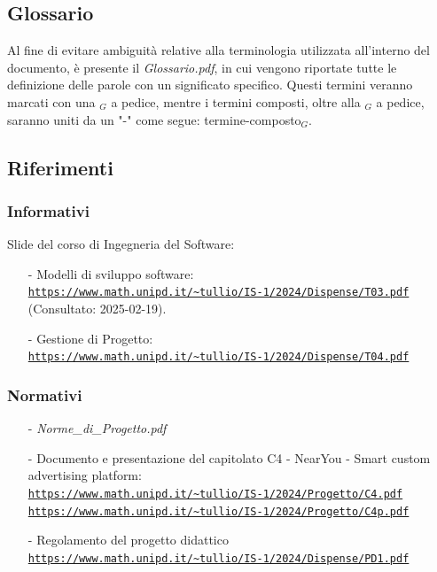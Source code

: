 \documentclass[10pt]{article}
\begin{document}
\subsection{Glossario}
Al fine di evitare ambiguità relative alla terminologia utilizzata all'interno del documento, è presente il \textit{Glossario.pdf}, in cui vengono riportate tutte le definizione delle parole con un significato specifico. Questi termini veranno marcati con una $_G$ a pedice, mentre i termini composti, oltre alla $_G$ a pedice, saranno uniti da un "-" come segue: termine-composto$_G$. 

\subsection{Riferimenti}
\subsubsection{Informativi}
Slide del corso di Ingegneria del Software:
\begin{itemize}
\item [-] Modelli di sviluppo software:\\ \textcolor{blue}{\texttt{\url{https://www.math.unipd.it/~tullio/IS-1/2024/Dispense/T03.pdf}}}\\
(Consultato: 2025-02-19).
    \item [-] Gestione di Progetto:\\ \textcolor{blue}{\texttt{\url{https://www.math.unipd.it/~tullio/IS-1/2024/Dispense/T04.pdf}}}
\end{itemize}

\subsubsection{Normativi}
\begin{itemize}
	\item [-] \textit{Norme\_di\_Progetto.pdf}
    \item [-] Documento e presentazione del capitolato C4 - NearYou - Smart custom advertising platform:\\
    \textcolor{blue}{\texttt{\url{https://www.math.unipd.it/~tullio/IS-1/2024/Progetto/C4.pdf}}}\\
    \textcolor{blue}{\texttt{\url{https://www.math.unipd.it/~tullio/IS-1/2024/Progetto/C4p.pdf}}}
    
    \item [-] Regolamento del progetto didattico\\ \textcolor{blue}{\texttt{\url{https://www.math.unipd.it/~tullio/IS-1/2024/Dispense/PD1.pdf}}}
\end{itemize}
\end{document}

